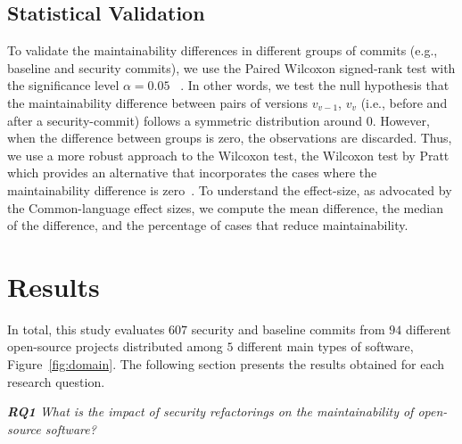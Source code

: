 \documentclass[10pt,conference]{IEEEtran}
\begin{document}
\subsection{Statistical Validation}\label{sec:statsval}
%
To validate the maintainability differences in different groups of commits
(e.g., baseline and security commits), we use the Paired Wilcoxon signed-rank
test with the significance level $\alpha = 0.05$~\cite{10.2307/3001968} . In
other words, we test the null hypothesis that the maintainability difference
between pairs of versions $v_{v-1}$, $v_v$ (i.e., before and after a
security-commit) follows a symmetric distribution around $0$. However, when the
difference between groups is zero, the observations are discarded. Thus, we use
a more robust approach to the Wilcoxon test, the Wilcoxon test by Pratt which
provides an alternative that incorporates the cases where the maintainability
difference is zero~\cite{10.2307/2282543}. To understand the effect-size, as
advocated by the Common-language effect sizes\cite{graw:1992}, we compute the
mean difference, the median of the difference, and the percentage of cases that
reduce maintainability.
%
\section{Results}\label{sec:results}

In total, this study evaluates $607$ security and baseline commits from $94$
different open-source projects distributed among $5$ different main types of
software, Figure~\ref{fig:domain}. The following section presents the results
obtained for each research question.

\begin{framed}
\textit{\textbf{RQ1} What is the impact of security refactorings on the
maintainability of open-source software?}
\end{framed}
\end{document}
